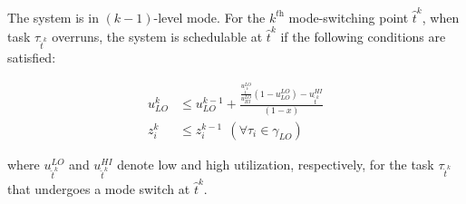 \documentclass[10pt,journal,compsoc]{IEEEtran}
\begin{document}
\begin{theorem}
\label{thm:3}
The system is in $(k-1)$-level \hi mode. For the $k^{\textit{th}}$ mode-switching point $\hat{t}^k$, when \hi task $\tau_{\hat{t}^k}$ overruns, the system is schedulable at $\hat{t}^k$ if the following conditions are satisfied:
\begin{footnotesize}  
\begin{align}
\label{eq:thm4:m0}
u_{LO}^{k}&\le{}u_{LO}^{k-1}+\frac{\frac{u_{\hat{t}^k}^{LO}}{u_{HI}^{LO}}(1-u_{LO}^{LO})-u_{\hat{t}^k}^{HI}}{(1-x)} \\
\label{eq:thm4:m01}
z_i^k&\le{}z_i^{k-1}\ \ (\forall \tau_i \in \gamma_{LO})
\end{align}
\end{footnotesize}
where $u_{\hat{t}^k}^{LO}$ and $u_{\hat{t}^k}^{HI}$ denote low and high utilization, respectively, for the \hi task $\tau_{\hat{t}^k}$ that undergoes a mode switch at $\hat{t}^k$.    
\end{theorem}
\end{document}
